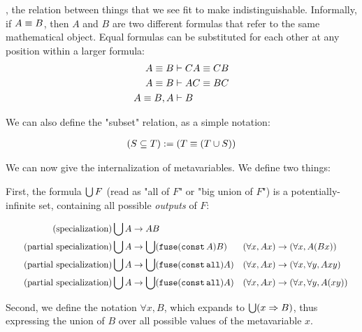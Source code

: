 \documentclass{article}
\begin{document}
  , the relation between things that we see fit to make indistinguishable. Informally, if $A \equiv B$, then $A$ and $B$ are two different formulas that refer to the same mathematical object. Equal formulas can be substituted for each other at any position within a larger formula:
  \begin{align*}
    A \equiv B &\vdash CA \equiv CB\\
    A \equiv B &\vdash AC \equiv BC\\
    A \equiv B, A &\vdash B\\
  \end{align*}

  We can also define the "subset" relation, as a simple notation:

  \begin{align*}
    (S \subseteq T) := (T \equiv (T \cup S))\\
  \end{align*}
  \fi

  
  
  

  We can now give the internalization of metavariables. We define two things:

  First, the formula $\bigcup F$ (read as "all of $F$" or "big union of $F$") is a potentially-infinite set, containing all possible \emph{outputs} of $F$:

  \begin{align*}
    \tag{specialization}
    \bigcup A &\to AB\\
    \tag{partial specialization}
    \bigcup A &\to \bigcup (\operatorname{\texttt{fuse}} (\operatorname{\texttt{const}} A) B) && (\forall x, Ax) \to (\forall x, A(Bx))\\
    \tag{partial specialization}
    \bigcup A &\to \bigcup (\operatorname{\texttt{fuse}} (\operatorname{\texttt{const}} \operatorname{\texttt{all}}) A) && (\forall x, Ax) \to (\forall x, \forall y, Axy)\\
    \tag{partial specialization}
    \bigcup A &\to \bigcup (\operatorname{\texttt{fuse}} (\operatorname{\texttt{const}} \operatorname{\texttt{all}}) A) && (\forall x, Ax) \to (\forall x, \forall y, A(xy))\\
  \end{align*}

  Second, we define the notation $\forall x, B$, which expands to $\bigcup (x \Rightarrow B)$, thus expressing the union of $B$ over all possible values of the metavariable $x$.
\end{document}
